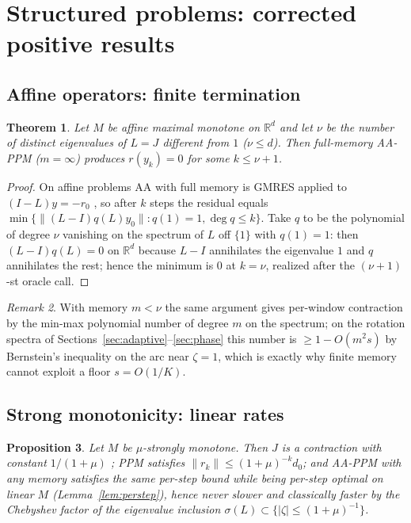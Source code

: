 \documentclass[11pt]{article}
\newtheorem{theorem}{Theorem}[section]
\newtheorem{proposition}[theorem]{Proposition}
\theoremstyle{definition}
\theoremstyle{remark}
\newtheorem{remark}[theorem]{Remark}
\newcommand{\R}{\mathbb{R}}
\newcommand{\norm}[1]{\| #1 \|}
\newcommand{\abs}[1]{| #1 |}
\begin{document}
\section{Structured problems: corrected positive results}\label{sec:structured}

\subsection{Affine operators: finite termination}

\begin{theorem}\label{thm:affine}
Let $M$ be affine maximal monotone on $\R^d$ and let $\nu$ be the number of
distinct eigenvalues of $L=J$ different from $1$ ($\nu\le d$). Then
full-memory AA-PPM ($m=\infty$) produces $r(y_k)=0$ for some $k\le\nu+1$.
\end{theorem}
\begin{proof}
On affine problems AA with full memory is GMRES applied to
$(I-L)y=-r_0$ \cite{walker2011anderson,evans2020proof}, so after $k$ steps
the residual equals $\min\{\norm{(L-I)q(L)y_0}:q(1)=1,\deg q\le k\}$.
Take $q$ to be the polynomial of degree $\nu$ vanishing on the spectrum of
$L$ off $\{1\}$ with $q(1)=1$: then $(L-I)q(L)=0$ on $\R^d$ because $L-I$
annihilates the eigenvalue $1$ and $q$ annihilates the rest; hence the
minimum is $0$ at $k=\nu$, realized after the $(\nu+1)$-st oracle call.
\end{proof}

\begin{remark}\label{rem:affinem}
With memory $m<\nu$ the same argument gives per-window contraction by the
min-max polynomial number of degree $m$ on the spectrum; on the rotation
spectra of Sections~\ref{sec:adaptive}--\ref{sec:phase} this number is
$\ge1-O(m^2 s)$ by Bernstein's inequality on the arc near $\zeta=1$, which
is exactly why finite memory cannot exploit a floor $s=O(1/K)$.
\end{remark}

\subsection{Strong monotonicity: linear rates}

\begin{proposition}\label{prop:strong}
Let $M$ be $\mu$-strongly monotone. Then $J$ is a contraction with constant
$1/(1+\mu)$ \cite{rockafellar1976mono}; PPM satisfies
$\norm{r_k}\le(1+\mu)^{-k}d_0$; and AA-PPM with any memory satisfies the
same per-step bound while being per-step optimal on linear $M$
(Lemma~\ref{lem:perstep}), hence never slower and classically faster by the
Chebyshev factor of the eigenvalue inclusion
$\sigma(L)\subset\{\abs{\zeta}\le(1+\mu)^{-1}\}$.
\end{proposition}
\end{document}
